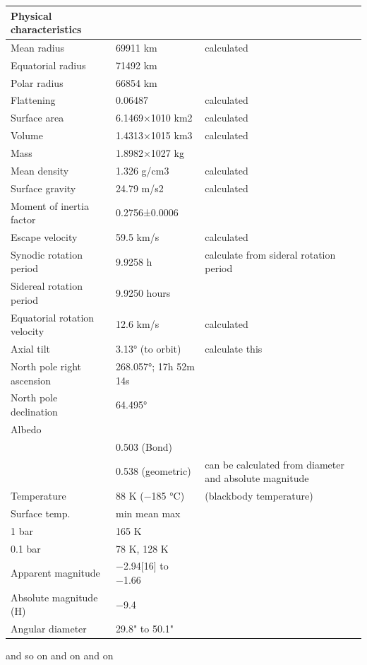 \begin{tabular}{ | l | l | p{3cm}|}
\hline
Physical characteristics & &  \\
\hline
Mean radius&69911 km & calculated\\
Equatorial radius&71492 km & \\
Polar radius&66854 km & \\
Flattening&0.06487 & calculated\\
Surface area&6.1469×1010 km2 & calculated\\
Volume&1.4313×1015 km3 & calculated\\
Mass&1.8982×1027 kg & \\
Mean density&1.326 g/cm3 & calculated\\
Surface gravity&24.79 m/s2 & calculated\\
Moment of inertia factor&0.2756±0.0006 & \\
Escape velocity&59.5 km/s & calculated\\
Synodic rotation period&9.9258 h & calculate from sideral rotation period \\
Sidereal rotation period&9.9250 hours  & \\
Equatorial rotation velocity&12.6 km/s & calculated\\
Axial tilt&3.13° (to orbit) & calculate this\\
North pole right ascension&268.057°; 17h 52m 14s & \\
North pole declination&64.495° & \\
Albedo&&\\  
&0.503 (Bond)  & \\
&0.538 (geometric) & can be calculated from diameter and absolute magnitude\\
Temperature&88 K (−185 °C)  & (blackbody temperature) \\
Surface temp.&min mean max  &\\
1 bar& 165 K & \\
0.1 bar&78 K, 128 K& \\
Apparent magnitude&−2.94[16] to −1.66 & \\
Absolute magnitude (H)&−9.4 & \\
Angular diameter&29.8" to 50.1" & \\
\hline
\end{tabular}

and so on and on and on